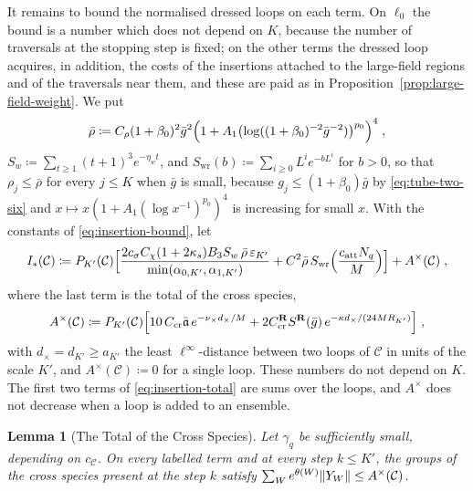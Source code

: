 \documentclass[11pt]{preprint}
\DeclarePairedDelimiter{\norm}{\lVert}{\rVert}
\numberwithin{equation}{section}
\newtheorem{lemma}[theorem]{Lemma}
\theoremstyle{definition}
\theoremstyle{remark}
\theoremstyle{plain}
\begin{document}
It remains to bound the normalised dressed loops on each term. On $\ell_0$ the bound is a number which does not depend on $K$, because the number of traversals at the stopping step is fixed; on the other terms the dressed loop acquires, in addition, the costs of the insertions attached to the large-field regions and of the traversals near them, and these are paid as in Proposition~\ref{prop:large-field-weight}. We put
\begin{equation}\label{eq:sup-amplitudes}
    \bar\rho \coloneqq C_\rho(1 + \beta_0)^2\bar g^2\Bigl(1 + A_1\bigl(\log((1 + \beta_0)^{-2}\bar g^{-2})\bigr)^{p_0}\Bigr)^4\;,
\end{equation}
$S_w \coloneqq \sum_{t \geq 1}(t + 1)^3e^{-\eta_wt}$, and $S_{\mathrm{wr}}(b) \coloneqq \sum_{i \geq 0}L^ie^{-bL^i}$ for $b > 0$, so that $\rho_j \leq \bar\rho$ for every $j \leq K$ when $\bar g$ is small, because $g_j \leq (1 + \beta_0)\bar g$ by \eqref{eq:tube-two-six} and $x \mapsto x(1 + A_1(\log x^{-1})^{p_0})^4$ is increasing for small $x$. With the constants of \eqref{eq:insertion-bound}, let
\begin{equation}\label{eq:insertion-total}
    I_*(\mathcal C) \coloneqq P_{K'}(\mathcal C)\Bigl[\frac{2c_\sigma C_\chi(1 + 2\kappa_s)B_3S_w\,\bar\rho\,\varepsilon_{K'}}{\min(\alpha_{0,K'}, \alpha_{1,K'})} + C^2\bar\rho\,S_{\mathrm{wr}}\Bigl(\frac{c_{\mathrm{att}}N_q}{M}\Bigr)\Bigr] + A^\times(\mathcal C)\;,
\end{equation}
where the last term is the total of the cross species,
\begin{equation}\label{eq:cross-total}
    A^\times(\mathcal C) \coloneqq P_{K'}(\mathcal C)\Bigl[10\,C_{\mathrm{cr}}\bar{\mathfrak a}\,e^{-\nu_\times d_\times/M} + 2C^{\mathbf R}_{\mathrm{cr}}S^{\mathbf R}(\bar g)\,e^{-\kappa d_\times/(24MR_{K'})}\Bigr]\;,
\end{equation}
with $d_\times = d_{K'} \geq a_{K'}$ the least $\ell^\infty$-distance between two loops of $\mathcal C$ in units of the scale $K'$, and $A^\times(\mathcal C) \coloneqq 0$ for a single loop. These numbers do not depend on $K$. The first two terms of \eqref{eq:insertion-total} are sums over the loops, and $A^\times$ does not decrease when a loop is added to an ensemble.

\begin{lemma}[The Total of the Cross Species]\label{lem:cross-total}
Let $\gamma_q$ be sufficiently small, depending on $c_{\mathcal C}$. On every labelled term and at every step $k \leq K'$, the groups of the cross species present at the step $k$ satisfy $\sum_We^{\theta(W)}\norm{Y_W} \leq A^\times(\mathcal C)$.
\end{lemma}
\end{document}
